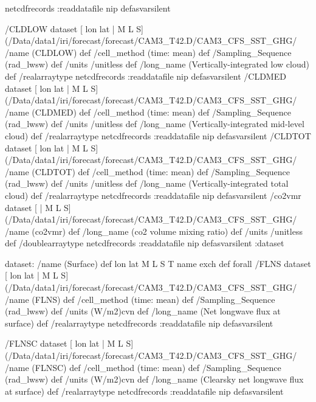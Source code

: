 \begin{ingrid}
{netcdfrecords 
:readdatafile
nip
}defasvarsilent

 /CLDLOW{
dataset
[ lon lat | M L S] (/Data/data1/iri/forecast/forecast/CAM3_T42.D/CAM3_CFS_SST_GHG/%
/name (CLDLOW) def
 /cell_method (time: mean) def
 /Sampling_Sequence (rad_lwsw) def
 /units /unitless def
 /long_name (Vertically-integrated low cloud) def
 /realarraytype netcdfrecords :readdatafile
nip
}defasvarsilent
 /CLDMED{
dataset
[ lon lat | M L S] (/Data/data1/iri/forecast/forecast/CAM3_T42.D/CAM3_CFS_SST_GHG/%
/name (CLDMED) def
 /cell_method (time: mean) def
 /Sampling_Sequence (rad_lwsw) def
 /units /unitless def
 /long_name (Vertically-integrated mid-level cloud) def
 /realarraytype netcdfrecords :readdatafile
nip
}defasvarsilent
 /CLDTOT{
dataset
[ lon lat | M L S] (/Data/data1/iri/forecast/forecast/CAM3_T42.D/CAM3_CFS_SST_GHG/%
/name (CLDTOT) def
 /cell_method (time: mean) def
 /Sampling_Sequence (rad_lwsw) def
 /units /unitless def
 /long_name (Vertically-integrated total cloud) def
 /realarraytype netcdfrecords :readdatafile
nip
}defasvarsilent
 /co2vmr{
dataset
[ | M L S] (/Data/data1/iri/forecast/forecast/CAM3_T42.D/CAM3_CFS_SST_GHG/%
/name (co2vmr) def
 /long_name (co2 volume mixing ratio) def
 /units /unitless def
 /doublearraytype netcdfrecords :readdatafile
nip
}defasvarsilent
:dataset 


dataset:
/name (Surface) def
{ lon lat M L S T } {name exch def} forall
 /FLNS{
dataset
[ lon lat | M L S] (/Data/data1/iri/forecast/forecast/CAM3_T42.D/CAM3_CFS_SST_GHG/%
/name (FLNS) def
 /cell_method (time: mean) def
 /Sampling_Sequence (rad_lwsw) def
 /units (W/m2)cvn def
 /long_name (Net longwave flux at surface) def
 /realarraytype netcdfrecords :readdatafile
nip
}defasvarsilent

 /FLNSC{
dataset
[ lon lat | M L S] (/Data/data1/iri/forecast/forecast/CAM3_T42.D/CAM3_CFS_SST_GHG/%
/name (FLNSC) def
 /cell_method (time: mean) def
 /Sampling_Sequence (rad_lwsw) def
 /units (W/m2)cvn def
 /long_name (Clearsky net longwave flux at surface) def
 /realarraytype netcdfrecords :readdatafile
nip
}defasvarsilent


\end{ingrid}
